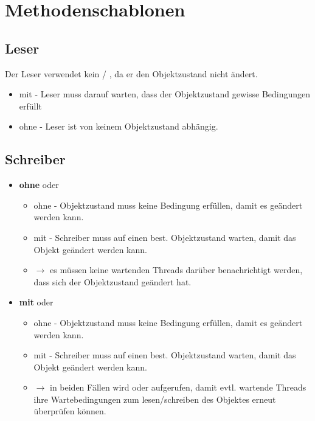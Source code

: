 \section{Methodenschablonen}

\subsection{Leser}

Der Leser verwendet kein  / , da er den Objektzustand nicht ändert.

\begin{itemize}
    \item mit  - Leser muss darauf warten, dass der Objektzustand gewisse Bedingungen erfüllt
    \item ohne  - Leser ist von keinem Objektzustand abhängig.
\end{itemize}


\subsection{Schreiber}

\begin{itemize}
    \item \textbf{ohne}  oder 
    \begin{itemize}
        \item ohne  - Objektzustand muss keine Bedingung erfüllen, damit es geändert werden kann.
        \item mit  - Schreiber muss auf einen best. Objektzustand warten, damit das Objekt geändert werden kann.
        \item[] $\rightarrow$ es müssen keine wartenden Threads darüber benachrichtigt werden, dass sich der Objektzustand geändert hat.
    \end{itemize}
    \item \textbf{mit}  oder 
    \begin{itemize}
        \item ohne  - Objektzustand muss keine Bedingung erfüllen, damit es geändert werden kann.
        \item mit  - Schreiber muss auf einen best. Objektzustand warten, damit das Objekt geändert werden kann.
        \item[] $\rightarrow$ in beiden Fällen wird  oder  aufgerufen, damit evtl. wartende Threads ihre Wartebedingungen zum lesen/schreiben des Objektes erneut überprüfen können.
    \end{itemize}

\end{itemize}



